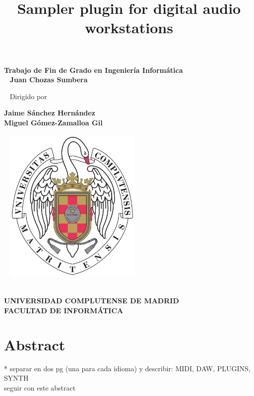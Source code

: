 \documentclass[12pt , a4paper]{article}
\title{\textbf{Sampler plugin for digital audio workstations}}
\date{\vspace{-10ex}}
\begin{document}
	\maketitle
	\begin{center}
		\textbf{Trabajo de Fin de Grado en Ingeniería Informática}\\
		
		~\newline
		\textbf{\large{Juan Chozas Sumbera}}
		
		~\newline
		Dirigido por
		
		\textbf{Jaime Sánchez Hernández\\
		Miguel Gómez-Zamalloa Gil}
		
		
		~\newline
		\includegraphics[width=0.5\textwidth]{logo_UCM.png}\\
		~\newline
		
		\textbf{\large{UNIVERSIDAD COMPLUTENSE DE MADRID}}\\
		
		\textbf{FACULTAD DE INFORMÁTICA}
	\end{center}

	
	
	\newpage
	\tableofcontents
	
	\newpage
	\section{Abstract}
	* separar en dos pg (una para cada idioma) y describir: MIDI, DAW, PLUGINS, SYNTH \\ seguir con este abstract
\end{document}
